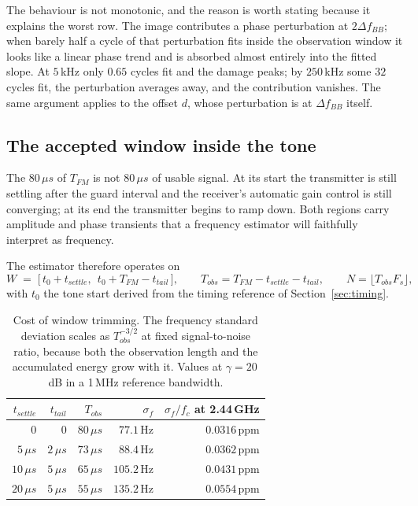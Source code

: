 \documentclass[11pt,a4paper]{article}
\newcommand{\us}{\,\ensuremath{\upmu}s}
\newcommand{\Tfm}{T_{FM}}
\providecommand{\upmu}{\mu}
\begin{document}
The behaviour is not monotonic, and the reason is worth stating because it explains the worst row.
The image contributes a phase perturbation at $2\Delta f_{BB}$; when barely half a cycle of that
perturbation fits inside the observation window it looks like a linear phase trend and is absorbed
almost entirely into the fitted slope. At $5$\,kHz only $0.65$ cycles fit and the damage peaks; by
$250$\,kHz some $32$ cycles fit, the perturbation averages away, and the contribution vanishes. The
same argument applies to the offset $d$, whose perturbation is at $\Delta f_{BB}$ itself.

\subsection{The accepted window inside the tone}

The $80\us$ of $\Tfm$ is not $80\us$ of usable signal. At its start the transmitter is still settling
after the guard interval and the receiver's automatic gain control is still converging; at its end
the transmitter begins to ramp down. Both regions carry amplitude and phase transients that a
frequency estimator will faithfully interpret as frequency.

The estimator therefore operates on
\begin{equation}
W \;=\; \bigl[\,t_0 + t_{settle},\ \ t_0 + \Tfm - t_{tail}\,\bigr],
\qquad
T_{obs} = \Tfm - t_{settle} - t_{tail},
\qquad
N = \lfloor T_{obs} F_s \rfloor ,
\label{eq:window}
\end{equation}
with $t_0$ the tone start derived from the timing reference of Section~\ref{sec:timing}.

\begin{table}[h]
\caption{Cost of window trimming. The frequency standard deviation scales as $T_{obs}^{-3/2}$ at
fixed signal-to-noise ratio, because both the observation length and the accumulated energy grow with
it. Values at $\gamma=20$\,dB in a 1\,MHz reference bandwidth.}
\label{tab:window}
\centering\small
\begin{tabular}{@{}rrrrr@{}}
\toprule
$t_{settle}$ & $t_{tail}$ & $T_{obs}$ & $\sigma_f$ & $\sigma_f/f_c$ at 2.44\,GHz \\
\midrule
$0$      & $0$     & $80\us$ & $77.1$\,Hz  & $0.0316$\,ppm \\
$5\us$   & $2\us$  & $73\us$ & $88.4$\,Hz  & $0.0362$\,ppm \\
$10\us$  & $5\us$  & $65\us$ & $105.2$\,Hz & $0.0431$\,ppm \\
$20\us$  & $5\us$  & $55\us$ & $135.2$\,Hz & $0.0554$\,ppm \\
\bottomrule
\end{tabular}
\end{table}
\end{document}
